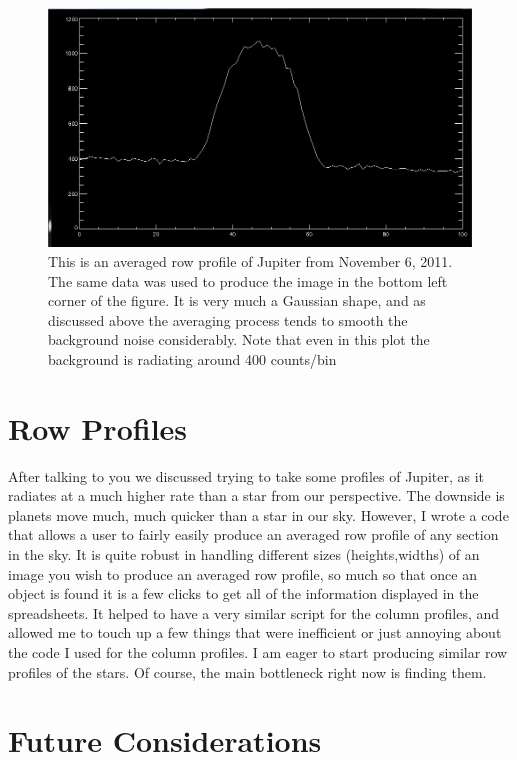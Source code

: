\documentclass[11pt]{article}
\begin{document}
\begin{figure}[h!]
\includegraphics[scale=0.7]{jupiter_line_plot.jpg}
\caption{This is an averaged row profile of Jupiter from November 6, 2011. The same data was used to produce the image in the bottom left corner of the figure. It is very much a Gaussian shape, and as discussed above the averaging process tends to smooth the background noise considerably. Note that even in this plot the background is radiating around 400 counts/bin }
\end{figure}


\section{Row Profiles}

After talking to you we discussed trying to take some profiles of Jupiter, as it radiates at a much higher rate than a star from our perspective. The downside is planets move much, much quicker than a star in our sky. However, I wrote a code that allows a user to fairly easily produce an averaged row profile of any section in the sky. It is quite robust in handling different sizes (heights,widths) of an image you wish to produce an averaged row profile, so much so that once an object is found it is a few clicks to get all of the information displayed in the spreadsheets. It helped to have a very similar script for the column profiles, and allowed me to touch up a few things that were inefficient or just annoying about the code I used for the column profiles. I am eager to start producing similar row profiles of the stars. Of course, the main bottleneck right now is finding them. 


\section{Future Considerations}
\end{document}
